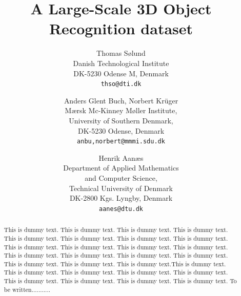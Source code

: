 \documentclass[10pt,twocolumn,letterpaper]{article}
\begin{document}
\title{A Large-Scale 3D Object Recognition dataset}

\author{Thomas S{\o}lund\\
Danish Technological Institute\\
DK-5230 Odense M, Denmark\\
{\tt\small thso@dti.dk}
\and
Anders Glent Buch, Norbert Kr\"u{}ger\\
M\ae{}rsk Mc-Kinney M\o{}ller Institute,\\
University of Southern Denmark,\\
DK-5230 Odense, Denmark \\
{\tt\small anbu,norbert@mmmi.sdu.dk}
\and
Henrik Aan\ae s\\ %
Department of Applied Mathematics\\ and Computer Science,\\ 
Technical University of Denmark\\
DK-2800 Kgs. Lyngby, Denmark\\
{\tt\small aanes@dtu.dk} %
}

\maketitle

\begin{abstract}
  This is dummy text. This is dummy text. This is dummy text. This is dummy text. This is dummy text. This is dummy text. This is dummy text. This is dummy text. This is dummy text. This is dummy text. This is dummy text. This is dummy text. This is dummy text. This is dummy text. This is dummy text. This is dummy text. This is dummy text. This is dummy text. This is dummy text.This is dummy text. This is dummy text. This is dummy text. This is dummy text. This is dummy text. This is dummy text. This is dummy text. This is dummy text. This is dummy text. To be written...........
\end{abstract}


\end{document}
